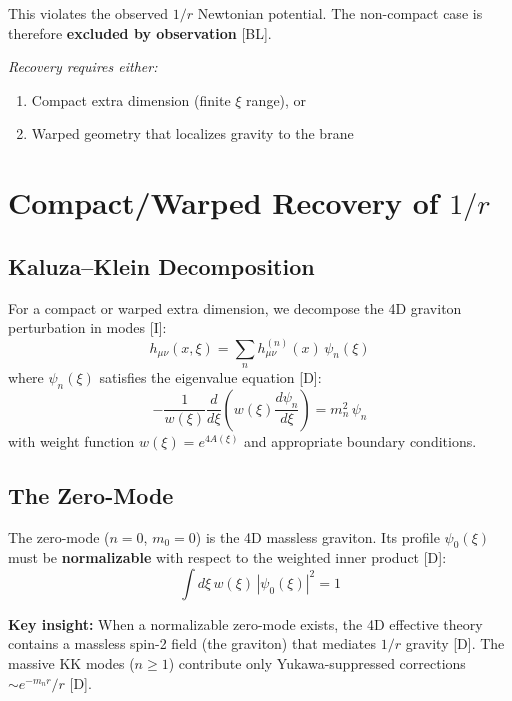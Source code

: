 \documentclass[11pt,a4paper]{article}
\begin{document}
This violates the observed $1/r$ Newtonian potential.
The non-compact case is therefore \textbf{excluded by observation} [BL].

\medskip
\noindent
\textit{Recovery requires either:}
\begin{enumerate}
    \item Compact extra dimension (finite $\xi$ range), or
    \item Warped geometry that localizes gravity to the brane
\end{enumerate}

\section{Compact/Warped Recovery of $1/r$}
\label{sec:recovery}

\subsection{Kaluza--Klein Decomposition}

For a compact or warped extra dimension, we decompose the 4D graviton
perturbation in modes [I]:
\begin{equation}
\label{eq:KK-decomposition}
h_{\mu\nu}(x,\xi) = \sum_n h_{\mu\nu}^{(n)}(x) \, \psi_n(\xi)
\end{equation}
where $\psi_n(\xi)$ satisfies the eigenvalue equation [D]:
\begin{equation}
\label{eq:eigenvalue}
-\frac{1}{w(\xi)} \frac{d}{d\xi} \left( w(\xi) \frac{d\psi_n}{d\xi} \right) = m_n^2 \, \psi_n
\end{equation}
with weight function $w(\xi) = e^{4A(\xi)}$ and appropriate boundary conditions.

\subsection{The Zero-Mode}

The zero-mode ($n=0$, $m_0 = 0$) is the 4D massless graviton.
Its profile $\psi_0(\xi)$ must be \textbf{normalizable} with respect to the
weighted inner product [D]:
\begin{equation}
\label{eq:normalization}
\boxed{
\int d\xi \, w(\xi) \, |\psi_0(\xi)|^2 = 1
}
\end{equation}

\textbf{Key insight:} When a normalizable zero-mode exists, the 4D effective
theory contains a massless spin-2 field (the graviton) that mediates
$1/r$ gravity [D]. The massive KK modes ($n \geq 1$) contribute only
Yukawa-suppressed corrections $\sim e^{-m_n r}/r$ [D].
\end{document}
